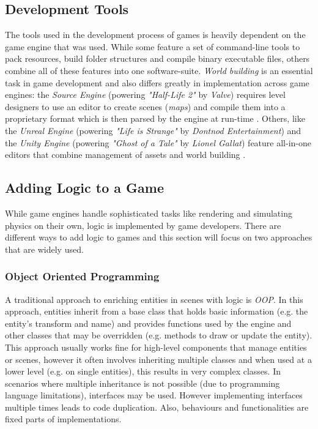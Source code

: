 \subsection{Development Tools}
The tools used in the development process of games is heavily dependent on the game engine that was used. While some feature a set of command-line tools to pack resources, build folder structures and compile binary executable files, others combine all of these features into one software-suite. \emph{World building} is an essential task in game development and also differs greatly in implementation across game engines: the \emph{Source Engine} (powering \emph{"Half-Life 2"} by \emph{Valve}) requires level designers to use an editor to create scenes (\emph{maps}) and compile them into a proprietary format which is then parsed by the engine at run-time \cite{SourceHammerEditor}. Others, like the \emph{Unreal Engine} (powering \emph{"Life is Strange"} by \emph{Dontnod Entertainment}) and the \emph{Unity Engine} (powering \emph{"Ghost of a Tale"} by \emph{Lionel Gallat}) feature all-in-one editors that combine management of assets and world building \cite{UnrealLevelEditor}\cite{UnityDocsOverview}.

\subsection{Adding Logic to a Game}
While game engines handle sophisticated tasks like rendering and simulating physics on their own, logic is implemented by game developers. There are different ways to add logic to games and this section will focus on two approaches that are widely used.

\subsubsection{Object Oriented Programming}
A traditional approach to enriching entities in scenes with logic is \emph{\ac{OOP}}. In this approach, entities inherit from a base class that holds basic information (e.g. the entity's transform and name) and provides functions used by the engine and other classes that may be overridden (e.g. methods to draw or update the entity). This approach usually works fine for high-level components that manage entities or scenes, however it often involves inheriting multiple classes and when used at a lower level (e.g. on single entities), this results in very complex classes. In scenarios where multiple inheritance is not possible (due to programming language limitations), interfaces may be used. However implementing interfaces multiple times leads to code duplication. Also, behaviours and functionalities are fixed parts of implementations.

